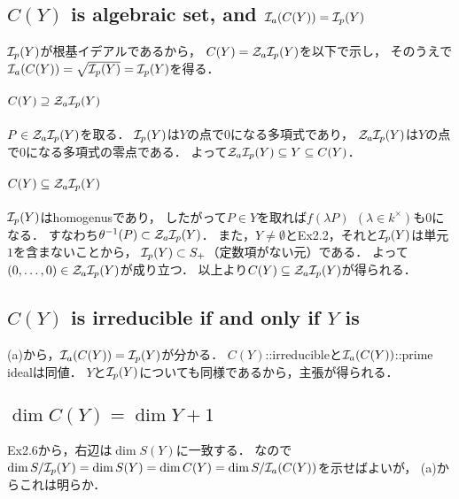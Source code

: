 \documentclass[a4paper]{jsarticle}
\begin{document}
\section{ } %
    \subsection{$C(Y)$ is algebraic set, and $\mathcal{I}_a(C(Y))=\mathcal{I}_p(Y)$}
    $\mathcal{I}_p(Y)$が根基イデアルであるから，
    $C(Y)=\mathcal{Z}_a \mathcal{I}_p(Y)$を以下で示し，
    そのうえで$\mathcal{I}_a(C(Y))=\sqrt{\mathcal{I}_p(Y)}=\mathcal{I}_p(Y)$を得る．

    \paragraph{$C(Y) \supseteq \mathcal{Z}_a \mathcal{I}_p(Y)$}
    $P \in \mathcal{Z}_a \mathcal{I}_p(Y)$を取る．
    $\mathcal{I}_p(Y)$は$Y$の点で0になる多項式であり，
    $\mathcal{Z}_a \mathcal{I}_p(Y)$は$Y$の点で0になる多項式の零点である．
    よって$\mathcal{Z}_a \mathcal{I}_p(Y) \subseteq Y \subseteq C(Y)$．

    \paragraph{$C(Y) \subseteq \mathcal{Z}_a \mathcal{I}_p(Y)$}
    $\mathcal{I}_p(Y)$はhomogenusであり，
    したがって$P \in Y$を取れば$f(\lambda P)~~(\lambda \in k^{\times})$も0になる．
    すなわち$\theta^{-1}(P) \subset \mathcal{Z}_a \mathcal{I}_p(Y)$．
    また，$Y \neq \emptyset$とEx2.2，それと$\mathcal{I}_p(Y)$は単元$1$を含まないことから，
    $\mathcal{I}_p(Y) \subset S_{+}$（定数項がない元）である．
    よって$(0,\dots,0) \in \mathcal{Z}_a \mathcal{I}_p(Y)$が成り立つ．
    以上より$C(Y) \subseteq \mathcal{Z}_a \mathcal{I}_p(Y)$が得られる．


    \subsection{$C(Y)$ is irreducible if and only if $Y$ is}
    (a)から，$\mathcal{I}_a(C(Y))=\mathcal{I}_p(Y)$が分かる．
    $C(Y)$::irreducibleと$\mathcal{I}_a(C(Y))$::prime idealは同値．
    $Y$と$\mathcal{I}_p(Y)$についても同様であるから，主張が得られる．

    \subsection{$\dim C(Y) = \dim Y + 1$}
    Ex2.6から，右辺は$\dim S(Y)$に一致する．
    なので$\dim S/\mathcal{I}_p(Y)=\dim S(Y)=\dim C(Y)=\dim S/\mathcal{I}_a(C(Y))$を示せばよいが，
    (a)からこれは明らか．

\section{ } %
\end{document}
